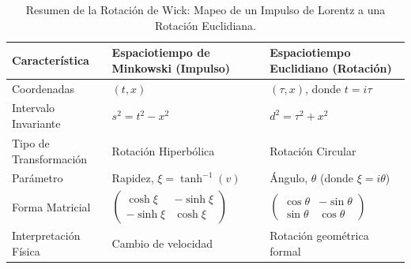 \documentclass[11pt,a4paper]{article}
\begin{document}
\begin{table}[h!]
\centering
\caption{Resumen de la Rotación de Wick: Mapeo de un Impulso de Lorentz a una Rotación Euclidiana.}
\label{tab:wick}
\begin{tabular}{l|l|l}
\hline
\textbf{Característica} & \textbf{Espaciotiempo de Minkowski (Impulso)} & \textbf{Espaciotiempo Euclidiano (Rotación)} \\
\hline \hline
Coordenadas & $(t, x)$ & $(\tau, x)$, donde $t = i\tau$ \\
\hline
Intervalo Invariante & $s^2 = t^2 - x^2$ & $d^2 = \tau^2 + x^2$ \\
\hline
Tipo de Transformación & Rotación Hiperbólica & Rotación Circular \\
\hline
Parámetro & Rapidez, $\xi = \tanh^{-1}(v)$ & Ángulo, $\theta$ (donde $\xi = i\theta$) \\
\hline
Forma Matricial & $\begin{pmatrix} \cosh\xi & -\sinh\xi \\ -\sinh\xi & \cosh\xi \end{pmatrix}$ & $\begin{pmatrix} \cos\theta & -\sin\theta \\ \sin\theta & \cos\theta \end{pmatrix}$ \\
\hline
Interpretación Física & Cambio de velocidad & Rotación geométrica formal \\
\hline
\end{tabular}
\end{table}
\end{document}
